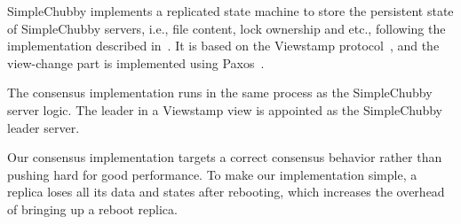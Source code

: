 SimpleChubby implements a replicated state machine to store the persistent
state of SimpleChubby servers, i.e., file content, lock ownership and etc.,
following the implementation described in~\cite{mazieres2007paxos}.
It is based on the Viewstamp protocol~\cite{oki1988viewstamped},
and the view-change part is implemented using Paxos~\cite{lamport2001paxos}.

The consensus implementation runs in the same process
as the SimpleChubby server logic.
The leader in a Viewstamp view is appointed as the SimpleChubby leader server.

Our consensus implementation targets a correct consensus behavior
rather than pushing hard for good performance.
To make our implementation simple,
a replica loses all its data and states after rebooting,
which increases the overhead of bringing up a reboot replica.

%
%
%
%
